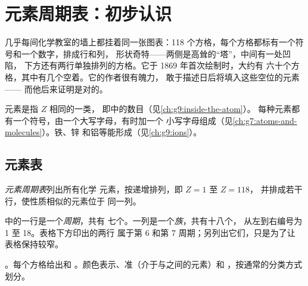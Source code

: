 \chapter{元素周期表：初步认识}\label{ch:g9:periodic-table-first-look}

几乎每间化学教室的墙上都挂着同一张图表：118
个方格，每个方格都标有一个符号和一个数字，排成行和列，
形状奇特——两侧是高耸的“塔”，中间有一处凹陷，
下方还有两行单独排列的方格。它于 1869 年首次绘制时，大约有
六十个方格，其中有几个空着。它的作者很有魄力，
敢于描述日后将填入这些空位的元素——
而他后来证明是对的。

\begin{recall}
元素是指 $Z$ 相同的一类，
即中的数目（见\cref{ch:g9:inside-the-atom}）。
每种元素都有一个符号，由一个大写字母，有时加一个
小写字母组成（见\cref{ch:g7:atoms-and-molecules}）。铁、锌
和铝等能形成（见\cref{ch:g9:ions}）。
\end{recall}

\section{元素表}

\begin{definition}[元素周期表]\label{def:g9:periodic-table-first-look:periodic-table}
\emph{元素周期表}列出所有化学
元素，按递增排列，即 $Z = 1$ 至 $Z = 118$，
并排成若干行，使性质相似的元素位于
同一列。
\end{definition}

\begin{definition}[周期与族]\label{def:g9:periodic-table-first-look:period}
中的一行是一个\emph{周期}，共有
七个。一列是一个\emph{族}，共有十八个，
从左到右编号为 1 至 18。表格下方印出的两行
属于第 6 和第 7 周期；另列出它们，只是为了让
表格保持较窄。
\end{definition}

\begin{omfigure}
\omperiodictable[colour=metals, legend=true, cell=0.86cm]

{\small {}。每个方格给出和
。颜色表示、准（介于与之间的元素）和
，按通常的分类方式划分。}
\end{omfigure}

